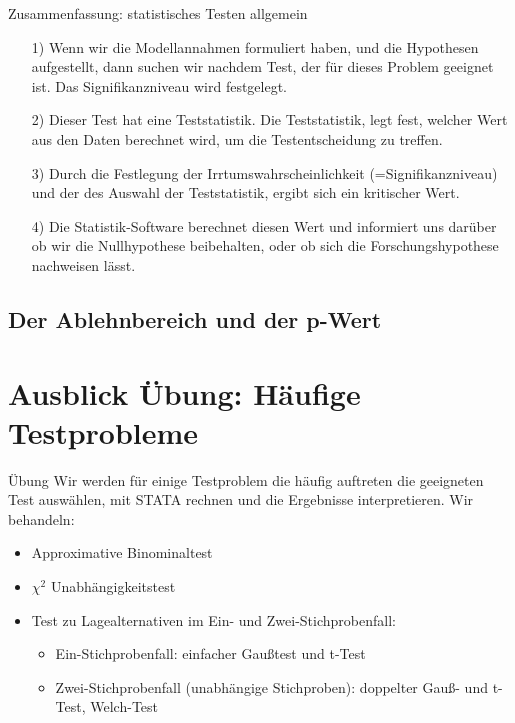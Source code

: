 \documentclass[usenames,dvipsnames,handout]{beamer}
\begin{document}
\begin{frame}{Zusammenfassung: statistisches Testen allgemein}
\begin{itemize}
\item[1)]{Wenn wir die Modellannahmen formuliert haben, und die Hypothesen aufgestellt, dann suchen wir nachdem Test, der für dieses Problem geeignet ist. Das Signifikanzniveau
wird festgelegt.}
\item[2)]{Dieser Test hat eine Teststatistik. Die Teststatistik, legt fest, welcher Wert aus den Daten berechnet wird, um die Testentscheidung zu treffen.}
\item[3)]{Durch die Festlegung der Irrtumswahrscheinlichkeit (=Signifikanzniveau) und der des Auswahl der Teststatistik, ergibt sich ein kritischer Wert. }
\item[4)]{Die Statistik-Software
berechnet diesen Wert und informiert uns darüber ob wir die Nullhypothese beibehalten, oder  ob sich die Forschungshypothese nachweisen lässt.}
\end{itemize}
\end{frame}

\subsection{Der Ablehnbereich und der p-Wert}

\section{Ausblick Übung: Häufige Testprobleme}%

\begin{frame}{Übung}
Wir werden für einige Testproblem die häufig auftreten die geeigneten Test auswählen, mit STATA rechnen und die Ergebnisse interpretieren.
Wir behandeln:
\begin{itemize}
\item{Approximative Binominaltest}%
\item{$\chi^{2}$ Unabhängigkeitstest}
\item{Test zu Lagealternativen im Ein- und Zwei-Stichprobenfall:}
\begin{itemize}
\item{Ein-Stichprobenfall: einfacher Gaußtest und  t-Test}%
\item{Zwei-Stichprobenfall (unabhängige Stichproben): doppelter Gauß- und t-Test, Welch-Test
 } %
\end{itemize}
\end{itemize}
\end{frame}
\end{document}
